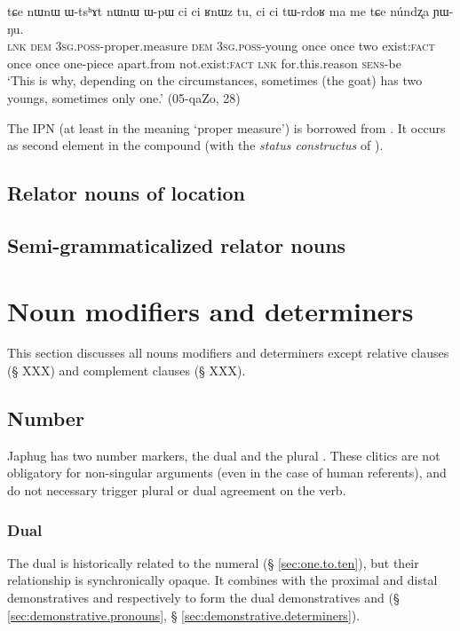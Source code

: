 \begin{exe}
\ex \label{ex:nWnW.WtshAt}
\gll tɕe nɯnɯ ɯ-tsʰɤt nɯnɯ ɯ-pɯ ci ci ʁnɯz tu, ci ci tɯ-rdoʁ ma me tɕe núndʐa ɲɯ-ŋu. \\
\textsc{lnk} \textsc{dem} \textsc{3sg}.\textsc{poss}-proper.measure \textsc{dem}  \textsc{3sg}.\textsc{poss}-young once once two exist:\textsc{fact} once once one-piece apart.from not.exist:\textsc{fact} \textsc{lnk} for.this.reason \textsc{sens}-be \\
\glt `This is why, depending on the circumstances, sometimes (the goat) has two youngs, sometimes only one.' (05-qaZo, 28)
\end{exe}

The IPN   (at least in the meaning `proper measure') is borrowed from . It occurs as second element in the compound (with the \textit{status constructus}  of ).

\subsection{Relator nouns of location} \label{sec:relator.location}
\subsection{Semi-grammaticalized relator nouns} \label{sec:semi.grammaticalized.relator} 

\section{Noun modifiers and determiners}
This section discusses all nouns modifiers and determiners except relative clauses (§ XXX) and complement clauses (§ XXX). 
 
\subsection{Number}  \label{sec:number.determiners}
Japhug has two number markers, the dual  and the plural . These clitics are not obligatory for non-singular arguments (even in the case of human referents), and do not necessary trigger plural or dual agreement on the verb. 

\subsubsection{Dual} \label{sec:dual.determiners}
The dual  is historically related to the numeral  (§ \ref{sec:one.to.ten}), but their relationship is synchronically opaque. It combines with the proximal and distal demonstratives  and  respectively to form the dual demonstratives  and  (§ \ref{sec:demonstrative.pronouns}, § \ref{sec:demonstrative.determiners}).

